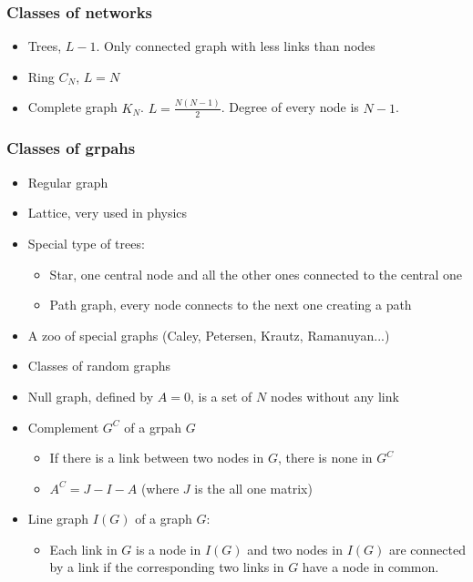 \subsubsection{Classes of networks}
\begin{itemize}
  \item Trees, $L- 1$. Only connected graph with less links than nodes
  \item Ring $C_N$, $L=N$
  \item Complete graph $K_N$. $L=\frac{N(N-1)}{2}$. Degree of every node is $N-1$.
\end{itemize}

\subsubsection{Classes of grpahs}
\begin{itemize}
  \item Regular graph
  \item Lattice, very used in physics
  \item Special type of trees:
  \begin{itemize}
    \item Star, one central node and all the other ones connected to the central one
    \item Path graph, every node connects to the next one creating a path
  \end{itemize}
  \item A zoo of special graphs (Caley, Petersen, Krautz, Ramanuyan...)
  \item Classes of random graphs
  \item Null graph, defined by $A = 0$, is a set of $N$ nodes without any link
  \item Complement $G^C$ of a grpah $G$
  \begin{itemize}
    \item If there is a link between two nodes in $G$, there is none in $G^C$
    \item $A^C = J - I - A$ (where $J$ is the all one matrix)
  \end{itemize}
  \item Line graph $I(G)$ of a graph $G$:
  \begin{itemize}
    \item Each link in $G$ is a node in $I(G)$ and two nodes in $I(G)$ are connected by a link
    if the corresponding two links in $G$ have a node in common.
  \end{itemize}
\end{itemize}

